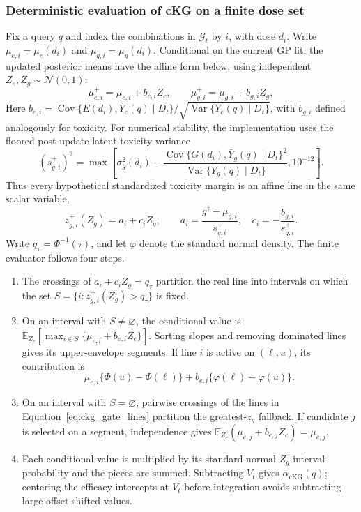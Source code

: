 \documentclass[11pt]{article}
\newcommand{\rev}[1]{{#1}}
\newcommand{\revisioncolor}{}
\begin{document}
\subsubsection{Deterministic evaluation of cKG on a finite dose set}\label{sec:ckg_evaluator}

\rev{Fix a query $q$ and index the combinations in $\mathcal G_t$ by $i$, with dose $d_i$. Write $\mu_{e,i}=\mu_e(d_i)$ and $\mu_{g,i}=\mu_g(d_i)$. Conditional on the current GP fit, the updated posterior means have the affine form below, using independent $Z_e,Z_g\sim\mathcal N(0,1)$:}
\begin{equation}\label{eq:ckg_affine_updates}
 \mu_{e,i}^{+}=\mu_{e,i}+b_{e,i}Z_e,\qquad
 \mu_{g,i}^{+}=\mu_{g,i}+b_{g,i}Z_g,
\end{equation}
\rev{Here $b_{e,i}=\operatorname{Cov}\{E(d_i),\bar Y_e(q)\mid D_t\}/\sqrt{\operatorname{Var}\{\bar Y_e(q)\mid D_t\}}$, with $b_{g,i}$ defined analogously for toxicity.} For numerical stability, the implementation uses the floored post-update latent toxicity variance
\[
\revisioncolor
 \left(s_{g,i}^{+}\right)^2=\max\!\left[\sigma_g^2(d_i)-
 \frac{\operatorname{Cov}\{G(d_i),\bar Y_g(q)\mid D_t\}^2}
 {\operatorname{Var}\{\bar Y_g(q)\mid D_t\}},10^{-12}\right].
\]
Thus every hypothetical standardized toxicity margin is an affine line in the same scalar variable,
\begin{equation}\label{eq:ckg_gate_lines}
 z_{g,i}^{+}(Z_g)=a_i+c_iZ_g,\qquad
 a_i=\frac{g^\dagger-\mu_{g,i}}{\rev{s_{g,i}^{+}}},\quad
 c_i=-\frac{b_{g,i}}{\rev{s_{g,i}^{+}}}.
\end{equation}
Write $q_\tau=\Phi^{-1}(\tau)$, and let $\varphi$ denote the standard normal density. The finite evaluator follows four steps.
\begin{enumerate}
\item The crossings of $a_i+c_iZ_g=q_\tau$ partition the real line into intervals on which the set $S=\{i:z^+_{g,i}(Z_g)>q_\tau\}$ is fixed.
\item On an interval with $S\ne\varnothing$, the conditional value is
$\mathbb E_{Z_e}[\max_{i\in S}\{\mu_{e,i}+b_{e,i}Z_e\}]$. Sorting slopes and removing dominated lines gives its upper-envelope segments. If line $i$ is active on $(\ell,u)$, its contribution is
\begin{equation}\label{eq:ckg_envelope_integral}
 \mu_{e,i}\{\Phi(u)-\Phi(\ell)\}+b_{e,i}\{\varphi(\ell)-\varphi(u)\}.
\end{equation}
\item On an interval with $S=\varnothing$, pairwise crossings of the lines in Equation~\eqref{eq:ckg_gate_lines} partition the greatest-$z_g$ fallback. If candidate $j$ is selected on a segment, independence gives $\mathbb E_{Z_e}(\mu_{e,j}+b_{e,j}Z_e)=\mu_{e,j}$.
\item Each conditional value is multiplied by its standard-normal $Z_g$ interval probability and the pieces are summed. Subtracting $V_t$ gives $\alpha_{\mathrm{cKG}}(q)$; centering the efficacy intercepts at $V_t$ before integration avoids subtracting large offset-shifted values.
\end{enumerate}
\end{document}

